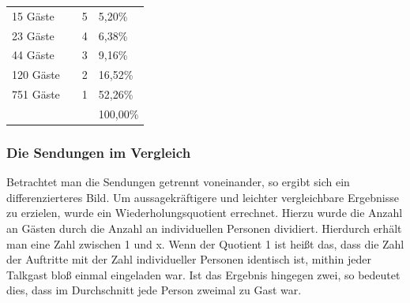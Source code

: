 \begin{table}[ht]
\begin{tabular}{@{}llll@{}}
			15 Gäste                          &                                    & 5                                      & 5,20\%                              \\
			23 Gäste                          &                                    & 4                                      & 6,38\%                              \\
			44 Gäste                          &                                    & 3                                      & 9,16\%                              \\
			120 Gäste                         &                                    & 2                                      & 16,52\%                             \\
			751 Gäste                         &                                    & 1                                      & 52,26\%                             \\
			\midrule
			&                                    &                                        & 100,00\% \\
			\bottomrule                           
		\end{tabular}
	\label{tab:gaesterangliste}
\end{table}

\subsubsection{Die Sendungen im Vergleich}

Betrachtet man die Sendungen getrennt voneinander, so ergibt sich ein differenzierteres Bild. Um aussagekräftigere und leichter vergleichbare Ergebnisse zu erzielen, wurde ein Wiederholungsquotient errechnet. Hierzu wurde die Anzahl an Gästen durch die Anzahl an individuellen Personen dividiert. Hierdurch erhält man eine Zahl zwischen 1 und x. Wenn der Quotient 1 ist heißt das, dass die Zahl der Auftritte mit der Zahl individueller Personen identisch ist, mithin jeder Talkgast bloß einmal eingeladen war. Ist das Ergebnis hingegen zwei, so bedeutet dies, dass im Durchschnitt jede Person zweimal zu Gast war.
 
